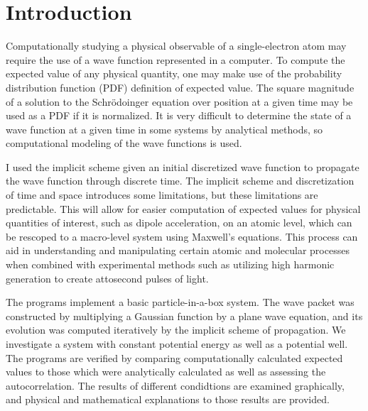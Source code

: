 \section*{Introduction}

Computationally studying a physical observable of a single-electron atom may
require the use of a wave function represented in a computer.  To compute
the expected value of any physical quantity, one may make use of the
probability distribution function (PDF) definition of expected value. The
square magnitude of a solution to the Schrödoinger equation over position at
a given time may be used as a PDF if it is normalized. It is very difficult
to determine the state of a wave function at a given time in some systems by
analytical methods, so computational modeling of the wave functions is used.

I used the implicit scheme given an initial discretized wave function to
propagate the wave function through discrete time. The implicit scheme and
discretization of time and space introduces some limitations, but these
limitations are predictable. This will allow for easier computation of
expected values for physical quantities of interest, such as dipole
acceleration, on an atomic level, which can be rescoped to a macro-level
system using Maxwell's equations. This process can aid in understanding and
manipulating certain atomic and molecular processes when combined with
experimental methods such as utilizing high harmonic generation to create
attosecond pulses of light.

The programs implement a basic particle-in-a-box system. The wave packet was
constructed by multiplying a Gaussian function by a plane wave equation, and
its evolution was computed iteratively by the implicit scheme of
propagation. We investigate a system with constant potential energy as well
as a potential well. The programs are verified by comparing computationally
calculated expected values to those which were analytically calculated as
well as assessing the autocorrelation. The results of different condidtions
are examined graphically, and physical and mathematical explanations to
those results are provided.
